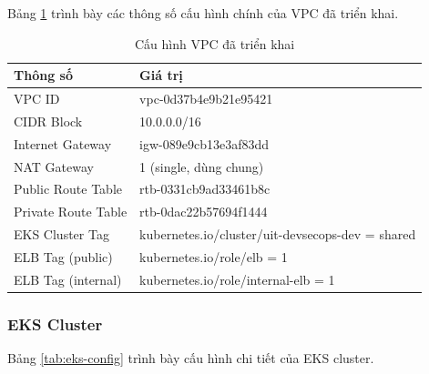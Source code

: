 \documentclass[13pt,a4paper,twoside]{extarticle}
\begin{document}
Bảng \ref{tab:vpc-config} trình bày các thông số cấu hình chính của VPC đã triển khai.

\begin{table}[H]
\centering
\begin{tabular}{@{}p{5cm} p{10cm}@{}}
\toprule
\textbf{Thông số} & \textbf{Giá trị} \\
\midrule
VPC ID & vpc-0d37b4e9b21e95421 \\
CIDR Block & 10.0.0.0/16 \\
Internet Gateway & igw-089e9cb13e3af83dd \\
NAT Gateway & 1 (single, dùng chung) \\
Public Route Table & rtb-0331cb9ad33461b8c \\
Private Route Table & rtb-0dac22b57694f1444 \\
EKS Cluster Tag & kubernetes.io/cluster/uit-devsecops-dev = shared \\
ELB Tag (public) & kubernetes.io/role/elb = 1 \\
ELB Tag (internal) & kubernetes.io/role/internal-elb = 1 \\
\bottomrule
\end{tabular}
\caption{Cấu hình VPC đã triển khai}
\label{tab:vpc-config}
\end{table}

\subsubsection{EKS Cluster}

Bảng \ref{tab:eks-config} trình bày cấu hình chi tiết của EKS cluster.
\end{document}
